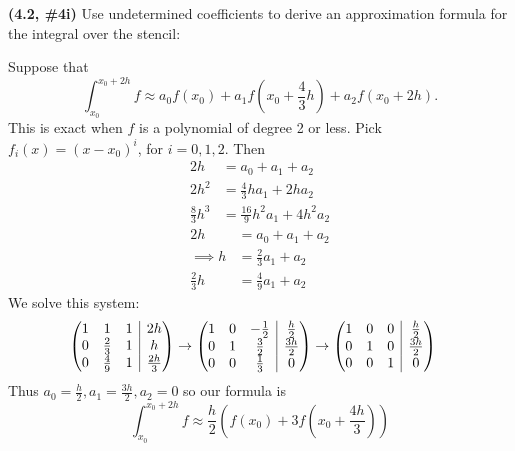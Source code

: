 \documentclass{eh-homework}
\begin{document}
\newpage
\begin{question}{6}
\textbf{(4.2, \#4i)} Use undetermined coefficients to derive an approximation formula for the integral over the stencil:

\begin{center}
\end{center}

Suppose that
\[
    \int _{x_0}^{x_0 + 2h} f \approx a_0 f(x_0) + a_1 f \left( x_0 + \frac{4}{3}h \right) + a_2 f(x_0 + 2h).
\]
This is exact when \(f\) is a polynomial of degree 2 or less. Pick \(f_i(x) = (x - x_0)^i\), for \(i = 0,1,2\). Then
\begin{align*}
    2h &= a_0 + a_1 + a_2 \\
    2h^2 &= \frac{4}{3}h a_1 + 2h a_2 \\
    \frac{8}{3}h^3 &= \frac{16}{9}h^2 a_1 + 4h^2 a_2
\end{align*}
\begin{align*}
    2h &= a_0 + a_1 + a_2 \\
    \implies h &= \frac{2}{3} a_1 + a_2 \\
    \frac{2}{3}h &= \frac{4}{9} a_1 + a_2
\end{align*}
We solve this system:
\begin{align*}
    \left( \begin{array}{@{}ccc|c@{}}
        1 & 1 & 1 & 2h \\
        0 & \frac{2}{3} & 1 & h \\
        0 & \frac{4}{9} & 1 & \frac{2h}{3}
    \end{array} \right) 
    &\rightarrow
    \left( \begin{array}{@{}ccc|c@{}}
        1 & 0 & -\frac{1}{2} & \frac{h}{2} \\
        0 & 1 & \frac{3}{2} & \frac{3h}{2} \\
        0 & 0 & \frac{1}{3} & 0
    \end{array} \right)
    \rightarrow
    \left( \begin{array}{@{}ccc|c@{}}
        1 & 0 & 0 & \frac{h}{2} \\
        0 & 1 & 0 & \frac{3h}{2} \\
        0 & 0 & 1 & 0
    \end{array} \right)
\end{align*}
Thus \(a_0 = \frac{h}{2}, a_1 = \frac{3h}{2}, a_2 = 0\) so our formula is
\[
    \int _{x_0}^{x_0 + 2h} f \approx \frac{h}{2}\left( f(x_0) + 3f \left( x_0 + \frac{4h}{3} \right) \right) 
\]
\end{question}
\end{document}
